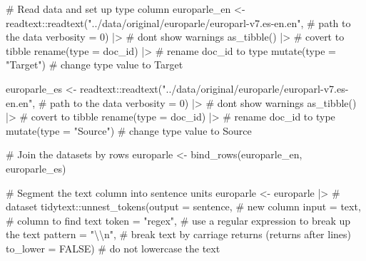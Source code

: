 \documentclass[
  letterpaper,
]{latex/krantz}
\newenvironment{Shaded}{\begin{snugshade}}{\end{snugshade}}
\newcommand{\AttributeTok}[1]{\textcolor[rgb]{0.40,0.45,0.13}{#1}}
\newcommand{\CommentTok}[1]{\textcolor[rgb]{0.37,0.37,0.37}{#1}}
\newcommand{\ConstantTok}[1]{\textcolor[rgb]{0.56,0.35,0.01}{#1}}
\newcommand{\DecValTok}[1]{\textcolor[rgb]{0.68,0.00,0.00}{#1}}
\newcommand{\FunctionTok}[1]{\textcolor[rgb]{0.28,0.35,0.67}{#1}}
\newcommand{\NormalTok}[1]{\textcolor[rgb]{0.00,0.23,0.31}{#1}}
\newcommand{\OtherTok}[1]{\textcolor[rgb]{0.00,0.23,0.31}{#1}}
\newcommand{\SpecialCharTok}[1]{\textcolor[rgb]{0.37,0.37,0.37}{#1}}
\newcommand{\StringTok}[1]{\textcolor[rgb]{0.13,0.47,0.30}{#1}}
\begin{document}
\begin{Shaded}
\begin{Highlighting}[]
\CommentTok{\# Read data and set up \textasciigrave{}type\textasciigrave{} column}
\NormalTok{europarle\_en }\OtherTok{\textless{}{-}}  
\NormalTok{  readtext}\SpecialCharTok{::}\FunctionTok{readtext}\NormalTok{(}\StringTok{"../data/original/europarle/europarl{-}v7.es{-}en.en"}\NormalTok{, }\CommentTok{\# path to the data}
                     \AttributeTok{verbosity =} \DecValTok{0}\NormalTok{) }\SpecialCharTok{|\textgreater{}} \CommentTok{\# don\textquotesingle{}t show warnings}
  \FunctionTok{as\_tibble}\NormalTok{() }\SpecialCharTok{|\textgreater{}} \CommentTok{\# covert to tibble}
  \FunctionTok{rename}\NormalTok{(}\AttributeTok{type =}\NormalTok{ doc\_id) }\SpecialCharTok{|\textgreater{}} \CommentTok{\# rename doc\_id to type}
  \FunctionTok{mutate}\NormalTok{(}\AttributeTok{type =} \StringTok{"Target"}\NormalTok{) }\CommentTok{\# change type value to \textquotesingle{}Target\textquotesingle{}}

\NormalTok{europarle\_es }\OtherTok{\textless{}{-}} 
\NormalTok{  readtext}\SpecialCharTok{::}\FunctionTok{readtext}\NormalTok{(}\StringTok{"../data/original/europarle/europarl{-}v7.es{-}en.en"}\NormalTok{, }\CommentTok{\# path to the data}
                     \AttributeTok{verbosity =} \DecValTok{0}\NormalTok{) }\SpecialCharTok{|\textgreater{}}  \CommentTok{\# don\textquotesingle{}t show warnings}
  \FunctionTok{as\_tibble}\NormalTok{() }\SpecialCharTok{|\textgreater{}} \CommentTok{\# covert to tibble}
  \FunctionTok{rename}\NormalTok{(}\AttributeTok{type =}\NormalTok{ doc\_id) }\SpecialCharTok{|\textgreater{}} \CommentTok{\# rename doc\_id to type}
  \FunctionTok{mutate}\NormalTok{(}\AttributeTok{type =} \StringTok{"Source"}\NormalTok{) }\CommentTok{\# change type value to \textquotesingle{}Source\textquotesingle{}}

\CommentTok{\# Join the datasets by rows}
\NormalTok{europarle }\OtherTok{\textless{}{-}} 
  \FunctionTok{bind\_rows}\NormalTok{(europarle\_en, europarle\_es)}

\CommentTok{\# Segment the \textasciigrave{}text\textasciigrave{} column into \textasciigrave{}sentence\textasciigrave{} units}
\NormalTok{europarle }\OtherTok{\textless{}{-}} 
\NormalTok{  europarle }\SpecialCharTok{|\textgreater{}} \CommentTok{\# dataset}
\NormalTok{  tidytext}\SpecialCharTok{::}\FunctionTok{unnest\_tokens}\NormalTok{(}\AttributeTok{output =}\NormalTok{ sentence, }\CommentTok{\# new column}
                          \AttributeTok{input =}\NormalTok{ text, }\CommentTok{\# column to find text}
                          \AttributeTok{token =} \StringTok{"regex"}\NormalTok{, }\CommentTok{\# use a regular expression to break up the text}
                          \AttributeTok{pattern =} \StringTok{"}\SpecialCharTok{\textbackslash{}\textbackslash{}}\StringTok{n"}\NormalTok{, }\CommentTok{\# break text by carriage returns (returns after lines)}
                          \AttributeTok{to\_lower =} \ConstantTok{FALSE}\NormalTok{) }\CommentTok{\# do not lowercase the text}


\end{Highlighting}
\end{Shaded}
\end{document}
